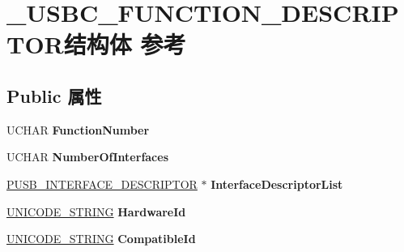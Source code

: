 \hypertarget{struct___u_s_b_c___f_u_n_c_t_i_o_n___d_e_s_c_r_i_p_t_o_r}{}\section{\+\_\+\+U\+S\+B\+C\+\_\+\+F\+U\+N\+C\+T\+I\+O\+N\+\_\+\+D\+E\+S\+C\+R\+I\+P\+T\+O\+R结构体 参考}
\label{struct___u_s_b_c___f_u_n_c_t_i_o_n___d_e_s_c_r_i_p_t_o_r}
\subsection*{Public 属性}
\begin{DoxyCompactItemize}
\item 
\mbox{\label{struct___u_s_b_c___f_u_n_c_t_i_o_n___d_e_s_c_r_i_p_t_o_r_ab8dacaa845b661cfd145bd82381b693c}} 
U\+C\+H\+AR {\bfseries Function\+Number}
\item 
\mbox{\label{struct___u_s_b_c___f_u_n_c_t_i_o_n___d_e_s_c_r_i_p_t_o_r_ab5a47a805eac6c720448f61724a54413}} 
U\+C\+H\+AR {\bfseries Number\+Of\+Interfaces}
\item 
\mbox{\label{struct___u_s_b_c___f_u_n_c_t_i_o_n___d_e_s_c_r_i_p_t_o_r_a4937feaa9f4f6cb91080acd7a7ba4fa8}} 
\hyperlink{struct___u_s_b___i_n_t_e_r_f_a_c_e___d_e_s_c_r_i_p_t_o_r}{P\+U\+S\+B\+\_\+\+I\+N\+T\+E\+R\+F\+A\+C\+E\+\_\+\+D\+E\+S\+C\+R\+I\+P\+T\+OR} $\ast$ {\bfseries Interface\+Descriptor\+List}
\item 
\mbox{\label{struct___u_s_b_c___f_u_n_c_t_i_o_n___d_e_s_c_r_i_p_t_o_r_adcfd19180ad3359b3dca11a06aabb41f}} 
\hyperlink{struct___u_n_i_c_o_d_e___s_t_r_i_n_g}{U\+N\+I\+C\+O\+D\+E\+\_\+\+S\+T\+R\+I\+NG} {\bfseries Hardware\+Id}
\item 
\mbox{\label{struct___u_s_b_c___f_u_n_c_t_i_o_n___d_e_s_c_r_i_p_t_o_r_a247f336dc321bffc9758a191b11a71e7}} 
\hyperlink{struct___u_n_i_c_o_d_e___s_t_r_i_n_g}{U\+N\+I\+C\+O\+D\+E\+\_\+\+S\+T\+R\+I\+NG} {\bfseries Compatible\+Id}

\end{DoxyCompactItemize}
